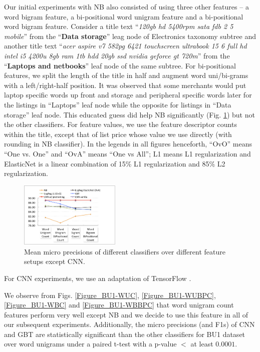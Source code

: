 Our initial experiments with NB also consisted of using three other features -- a word bigram feature, a bi-positional word unigram feature and a bi-positional word bigram feature.
Consider a title text ``\textit{120gb hd 5400rpm sata fdb 2 5 mobile}'' from the ``\textbf{Data storage}'' leag node of Electronics taxonomy subtree and another title text ``\textit{acer aspire v7 582pg 6421 touchscreen ultrabook 15 6 full hd intel i5 4200u 8gb ram 1tb hdd 20gb ssd nvidia geforce gt 720m}'' from the ``\textbf{Laptops and netbooks}'' leaf node of the same subtree.
For bi-positional features, we split the length of the title in half and augment word uni/bi-grams with a left/right-half position. It was observed that some merchants would put laptop specific words up front and storage and peripheral specific words later for the listings in ``Laptops'' leaf node while the opposite for listings in ``Data storage'' leaf node.
This educated guess did help NB significantly (Fig. \ref{Figure_BU1-predictions-feature-averages}) but not the other classifiers.
For feature values, we use the feature descriptor counts within the title, except that of list price whose value we use directly (with rounding in NB classifier).
In the legends in all figures henceforth, ``OvO'' means ``One vs. One'' and ``OvA'' means ``One vs All''; L1 means L1 regularization \cite{LibLinear} and ElasticNet \cite{Zou05:EN} is a linear combination of 15\% L1 regularization and 85\% L2 regularization.
\begin{figure}
	\vspace{-0.6cm}
	\centering
	\includegraphics[width=0.43\textwidth]{images/BU1-mean-micro-precision}
	\caption{\small{Mean micro precisions of different classifiers over different feature setups except CNN.}}
	\label{Figure_BU1-predictions-feature-averages}
	\vspace{-0.4cm}
\end{figure}
For CNN experiments, we use an adaptation of TensorFlow \cite{TensorFlow}.

We observe from Figs. \ref{Figure_BU1-WUC}, \ref{Figure_BU1-WUBPC}, \ref{Figure_BU1-WBC} and \ref{Figure_BU1-WBBPC} that word unigram count features perform very well except NB and we decide to use this feature in all of our subsequent experiments.
Additionally, the micro precisions (and F1s) of CNN and GBT are statistically significant than the other classifiers for BU1 dataset over word unigrams under a paired t-test with a p-value $<$ at least $0.0001$. 


